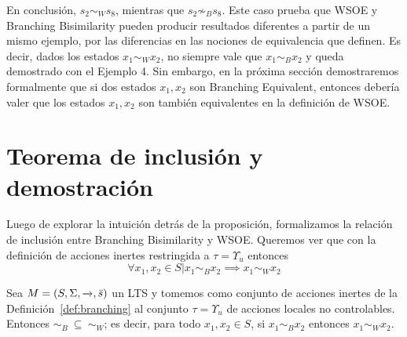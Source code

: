 En conclusión, $s_2\sim_{W}s_8$, mientras que  $s_2 \not\sim_{B}s_8$. Este caso prueba que WSOE y Branching Bisimilarity pueden producir resultados diferentes a partir de un mismo ejemplo, por las diferencias en las nociones de equivalencia que definen. Es decir, dados los estados $x_1\sim_{W}x_2$, no siempre vale que $x_1\sim_{B}x_2$ y queda demostrado con el Ejemplo 4. Sin embargo, en la próxima sección demostraremos formalmente que si dos estados $x_1,x_2$ son Branching Equivalent, entonces debería valer que los estados $x_1,x_2$ son también equivalentes en la definición de WSOE. 

\section{Teorema de inclusión y demostración}
\label{sec:teorema}

Luego de explorar la intuición detrás de la proposición, formalizamos la relación de inclusión entre Branching Bisimilarity y WSOE. Queremos ver que con la definición de acciones inertes restringida a $\tau = \Upsilon_u$ entonces 
\[ \forall x_1,x_2 \in S | x_1 \sim_{B} x_2 \implies  x_1 \sim_{W} x_2 \]

\begin{theorem}
\label{thm:wsoe-refina-branching}
Sea $M=(S,\Sigma,\xrightarrow[]{},\bar{s})$ un LTS y tomemos como conjunto de acciones inertes de la Definición~\ref{def:branching} al conjunto $\tau=\Upsilon_u$ de acciones locales no controlables. Entonces $\sim_{B}\ \subseteq\ \sim_{W}$; es decir, para todo $x_1,x_2\in S$, si $x_1\sim_{B}x_2$ entonces $x_1\sim_{W}x_2$.
\end{theorem}

